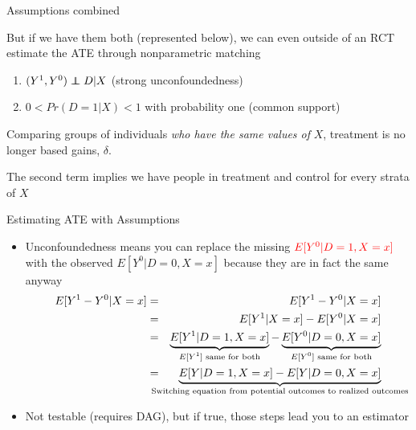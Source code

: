\documentclass{beamer}
\newcommand\independent{\protect\mathpalette{\protect\independenT}{\perp}}
\def\independenT#1#2{\mathrel{\rlap{$#1#2$}\mkern2mu{#1#2}}}
\begin{document}
\begin{frame}{Assumptions combined}
	
But if we have them both (represented below), we can even outside of an RCT estimate the ATE through nonparametric matching
  \begin{enumerate}
		\item $(Y^1,Y^0) \independent{D} | X$ (strong unconfoundedness)
		\item $0<Pr(D=1|X)<1$ with probability one (common support)
  \end{enumerate}

\bigskip
Comparing groups of individuals \emph{who have the same values of} $X$, treatment is no longer based gains, $\delta$. 

\bigskip

The second term implies we have people in treatment and control for every strata of $X$
\end{frame}


\begin{frame}{Estimating ATE with Assumptions}


	\begin{itemize}
	\item Unconfoundedness means you can replace the missing $\textcolor{red}{E[Y^0|D=1,X=x]}$ with the observed $E[Y^0|D=0, X=x]$ because they are in fact the same anyway
		\begin{eqnarray*}
		E[Y^1-Y^0|X=x] &=& E[Y^1 - Y^0 | X=x] \\
		&=& E[Y^1|X=x] - E[Y^0 | X=x] \\
		&=& \underbrace{E[Y^1|D=1,X=x]}_{\mathclap{\text{$E[Y^1]$ same for both}}} - \underbrace{E[Y^0 | D=0,X=x]}_{\mathclap{\text{$E[Y^0]$ same for both}}} \\
		&=&\underbrace{E[Y|D=1,X=x] - E[Y|D=0, X=x]}_{\mathclap{\text{Switching equation from potential outcomes to realized outcomes}}}
		\end{eqnarray*}
	\item Not testable (requires DAG), but if true, those steps lead you to an estimator
	\end{itemize}

\end{frame}
\end{document}
